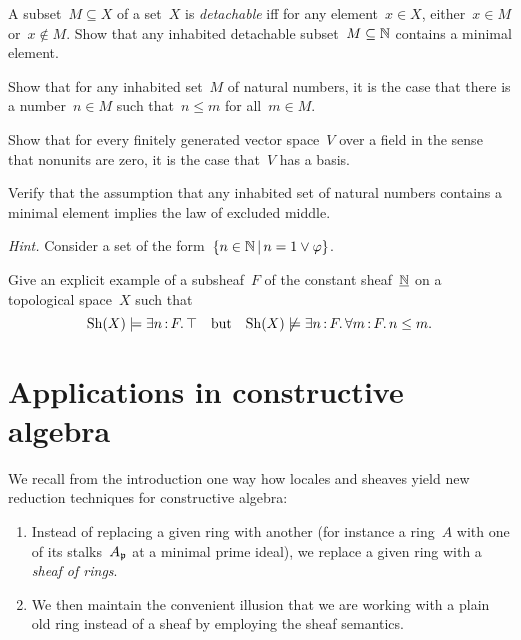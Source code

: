 \documentclass{ws-rv9x6}
\begin{document}
{\begin{exercise}%
\label{ex:least-number-principle}%
\begin{alphlist}[(e)]
\item A subset~$M \subseteq X$ of a set~$X$ is \emph{detachable} iff for any
element~$x \in X$, either~$x \in M$ or~$x \not\in M$. Show that any inhabited
detachable subset~$M \subseteq \mathbb{N}$ contains a minimal element.
\item Show that for any inhabited set~$M$ of natural numbers, it is \notnot the
case that there is a number~$n \in M$ such that~$n \leq m$ for all~$m \in M$.
\item Show that for every finitely generated vector space~$V$ over a field in the
sense that nonunits are zero, it is \notnot the case that~$V$ has a basis.
\item Verify that the assumption that any inhabited set of natural numbers
contains a minimal element implies the law of excluded middle.\smallskip

{\scriptsize\emph{Hint.} Consider a set of the form~$\{ n \in \mathbb{N} \,|\, n = 1
\vee \varphi \}$.\par}
\item Give an explicit example of a subsheaf~$F$ of the constant
sheaf~$\underline{\mathbb{N}}$ on a topological space~$X$ such that
\[ \mathrm{Sh}(X) \models \exists n\,{:}\,F\mathpunct{.} \top
  \quad\text{but}\quad
  \mathrm{Sh}(X) \not\models \exists n\,{:}\,F\mathpunct{.} \forall m\,{:}\,F\mathpunct{.} n \leq m. \]
\end{alphlist}
\end{exercise}



\section{Applications in constructive algebra}
\label{sect:appl}

We recall from the introduction one way how locales and sheaves yield new
reduction techniques for constructive algebra:
\begin{enumerate}
\item Instead of replacing a given ring with another (for instance a ring~$A$ with
one of its stalks~$A_{\mathfrak{p}}$ at a minimal prime ideal), we replace a given ring
with a \emph{sheaf of rings}.
\item We then maintain the convenient illusion that we are working with a plain old ring
instead of a sheaf by employing the sheaf semantics.
\end{enumerate}

}
\end{document}
